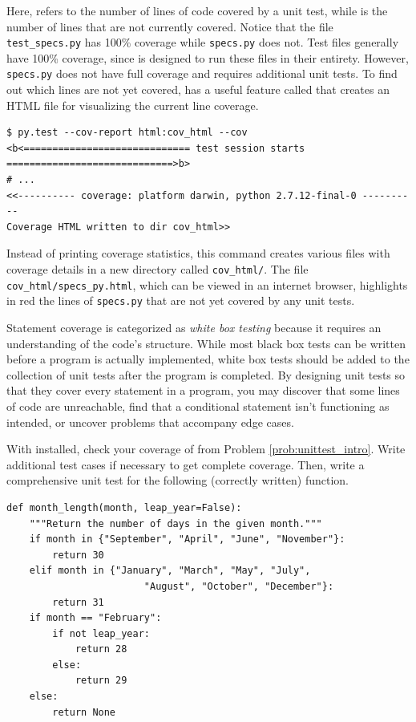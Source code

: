 Here,  refers to the number of lines of code covered by a unit test, while  is the number of lines that are not currently covered.
Notice that the file \texttt{test\_specs.py} has 100\% coverage while \texttt{specs.py} does not.
Test files generally have 100\% coverage, since  is designed to run these files in their entirety.
However, \texttt{specs.py} does not have full coverage and requires additional unit tests.
To find out which lines are not yet covered,  has a useful feature called  that creates an HTML file for visualizing the current line coverage.

\begin{lstlisting}
$ py.test --cov-report html:cov_html --cov
<b<============================= test session starts =============================>b>
# ...
<<---------- coverage: platform darwin, python 2.7.12-final-0 ----------
Coverage HTML written to dir cov_html>>
\end{lstlisting}

Instead of printing coverage statistics, this command creates various files with coverage details in a new directory called \texttt{cov\_html/}.
The file \texttt{cov\_html/specs\_py.html}, which can be viewed in an internet browser, highlights in red the lines of \texttt{specs.py} that are not yet covered by any unit tests.

\begin{info} %
Statement coverage is categorized as \emph{white box testing} because it requires an understanding of the code's structure.
While most black box tests can be written before a program is actually implemented, white box tests should be added to the collection of unit tests after the program is completed.
By designing unit tests so that they cover every statement in a program, you may discover that some lines of code are unreachable, find that a conditional statement isn't functioning as intended, or uncover problems that accompany edge cases.
\end{info}

\begin{problem} %
With  installed, check your coverage of  from Problem \ref{prob:unittest_intro}.
Write additional test cases if necessary to get complete coverage.
Then, write a comprehensive unit test for the following (correctly written) function.

\begin{lstlisting}
def month_length(month, leap_year=False):
    """Return the number of days in the given month."""
    if month in {"September", "April", "June", "November"}:
        return 30
    elif month in {"January", "March", "May", "July",
                        "August", "October", "December"}:
        return 31
    if month == "February":
        if not leap_year:
            return 28
        else:
            return 29
    else:
        return None
\end{lstlisting}
\end{problem}

